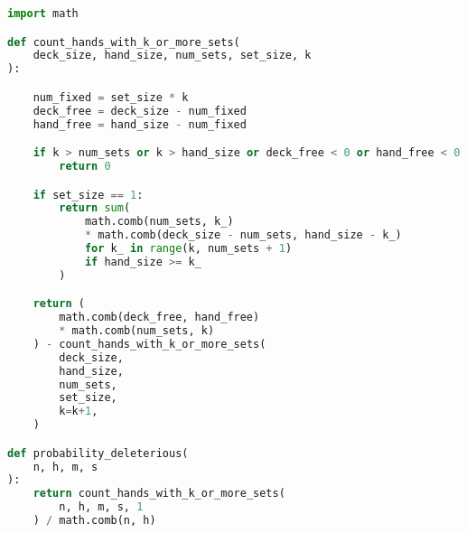 \begin{lstlisting}[language=python, caption={Formula to calculate probability of deleterious outcome in nopout interpolation.}, label={lst:probability_deleterious}]
import math

def count_hands_with_k_or_more_sets(
    deck_size, hand_size, num_sets, set_size, k
):

    num_fixed = set_size * k
    deck_free = deck_size - num_fixed
    hand_free = hand_size - num_fixed

    if k > num_sets or k > hand_size or deck_free < 0 or hand_free < 0:
        return 0

    if set_size == 1:
        return sum(
            math.comb(num_sets, k_)
            * math.comb(deck_size - num_sets, hand_size - k_)
            for k_ in range(k, num_sets + 1)
            if hand_size >= k_
        )

    return (
        math.comb(deck_free, hand_free)
        * math.comb(num_sets, k)
    ) - count_hands_with_k_or_more_sets(
        deck_size,
        hand_size,
        num_sets,
        set_size,
        k=k+1,
    )

def probability_deleterious(
    n, h, m, s
):
    return count_hands_with_k_or_more_sets(
        n, h, m, s, 1
    ) / math.comb(n, h)

\end{lstlisting}
